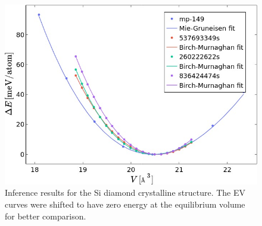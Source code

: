 \begin{figure}
  \begin{center}
    \includegraphics[width=.8\textwidth]{
      asset/crystalline_ev_curves.jpg
    }
  \end{center}
  \caption{Inference results for the Si diamond crystalline structure. The EV
  curves were shifted to have zero energy at the equilibrium volume for better
  comparison.}
  \label{fig:crystalline_inference}
\end{figure}


